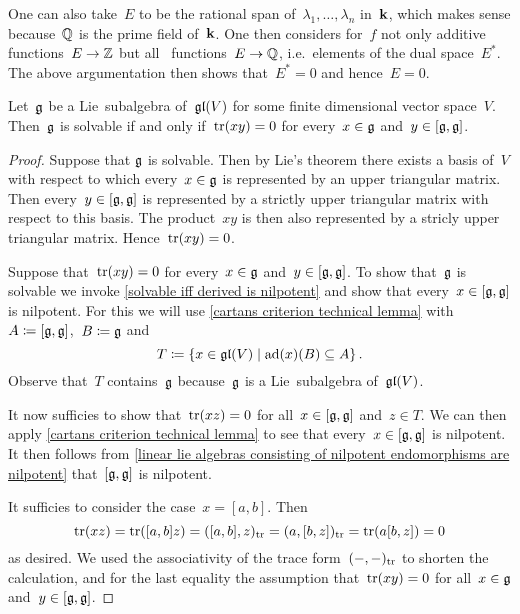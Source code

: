 \begin{remark}
  One can also take~$E$ to be the rational span of~$\lambda_1, \dotsc, \lambda_n$ in~$\mathbf{k}$, which makes sense because~$\Rational$ is the prime field of~$\mathbf{k}$.
  One then considers for~$f$ not only additive functions~$E \to \mathbb{Z}$ but all~{\linear{$\Rational$}} functions~$E \to \mathbb{Q}$, i.e.\ elements of the dual space~$E^*$.
  The above argumentation then shows that~$E^* = 0$ and hence~$E = 0$.
\end{remark}


\begin{lemma}
  \label{cartans criterion for linear lie algebra}
  Let~$\mathfrak{g}$ be a Lie~subalgebra of~$\mathfrak{gl}(V)$ for some finite dimensional vector space~$V$.
  Then~$\mathfrak{g}$ is solvable if and only if~$\operatorname{tr}(xy) = 0$ for every~$x \in \mathfrak{g}$ and~$y \in [\mathfrak{g}, \mathfrak{g}]$.
\end{lemma}


\begin{proof}
  Suppose that $\mathfrak{g}$ is solvable.
  Then by Lie’s theorem there exists a basis of~$V$ with respect to which every~$x \in \mathfrak{g}$ is represented by an upper triangular matrix.
  Then every~$y \in [\mathfrak{g},\mathfrak{g}]$ is represented by a strictly upper triangular matrix with respect to this basis.
  The product~$xy$ is then also represented by a stricly upper triangular matrix. 
  Hence~$\operatorname{tr}(xy) = 0$.
  
  Suppose that~$\operatorname{tr}(xy) = 0$ for every~$x \in \mathfrak{g}$ and~$y \in [\mathfrak{g}, \mathfrak{g}]$.
  To show that~$\mathfrak{g}$ is solvable we invoke \cref{solvable iff derived is nilpotent} and show that every~$x \in [\mathfrak{g}, \mathfrak{g}]$ is nilpotent.
  For this we will use \cref{cartans criterion technical lemma} with~$A \coloneqq [\mathfrak{g}, \mathfrak{g}]$,~$B \coloneqq \mathfrak{g}$ and
  \[
    T
    \defined
    \{
      x
      \in
      \gllie(V)
    \suchthat
      \ad(x)(B)
      \subseteq
      A
    \} \,.
  \]
  Observe that~$T$ contains~$\mathfrak{g}$ because~$\mathfrak{g}$ is a Lie~subalgebra of~$\mathfrak{gl}(V)$.
  
  It now sufficies to show that~$\operatorname{tr}(xz) = 0$ for all~$x \in [\mathfrak{g}, \mathfrak{g}]$ and~$z \in T$.
  We can then apply \cref{cartans criterion technical lemma} to see that every~$x \in [\mathfrak{g}, \mathfrak{g}]$ is nilpotent.
  It then follows from \cref{linear lie algebras consisting of nilpotent endomorphisms are nilpotent} that~$[\mathfrak{g}, \mathfrak{g}]$ is nilpotent.
  
  It sufficies to consider the case~$x = [a,b]$.
  Then
  \[
    \operatorname{tr}(x z)
    =
    \operatorname{tr}([a,b] z)
    =
    ([a,b], z)_{\operatorname{tr}}
    =
    (a, [b,z])_{\operatorname{tr}}
    =
    \operatorname{tr}(a [b,z])
    =
    0
  \]
  as desired.
  We used the associativity of the trace form~$(-,-)_{\operatorname{tr}}$ to shorten the calculation, and for the last equality the assumption that~$\operatorname{tr}(xy) = 0$ for all~$x \in \mathfrak{g}$ and~$y \in [\mathfrak{g}, \mathfrak{g}]$.
\end{proof}


